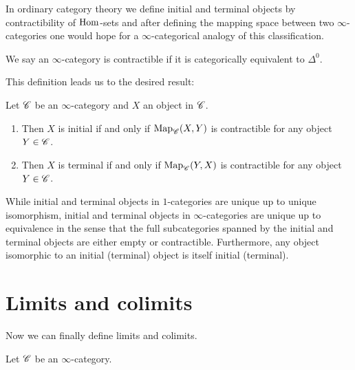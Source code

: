 \documentclass[../../thesis.tex]{subfiles}
\begin{document}
In ordinary category theory we define initial and terminal objects by contractibility of $\mathrm{Hom}$-sets and after defining the mapping space between two $\infty$-categories one would hope for a $\infty$-categorical analogy of this classification.
\begin{definition}
    We say an $\infty$-category is contractible if it is categorically equivalent to $\Delta^0$.
\end{definition}
This definition leads us to the desired result:
\begin{proposition}
    Let $\mathscr{C}$ be an $\infty$-category and $X$ an object in $\mathscr{C}$.
    \begin{enumerate}
        \item Then $X$ is initial if and only if $\mathrm{Map}_{\mathscr{C}}(X,Y)$ is contractible for any object $Y\in \mathscr{C}$.
        \item Then $X$ is terminal if and only if $\mathrm{Map}_{\mathscr{C}}(Y,X)$ is contractible for any object $Y\in \mathscr{C}$.
    \end{enumerate}
\end{proposition}
While initial and terminal objects in $1$-categories are unique up to unique isomorphism, initial and terminal objects in $\infty$-categories are unique up to equivalence in the sense that the full subcategories spanned by the initial and terminal objects are either empty or contractible.
Furthermore, any object isomorphic to an initial (terminal) object is itself initial (terminal).
\section{Limits and colimits}
Now we can finally define limits and colimits.
\begin{definition}
    Let $\mathscr{C}$ be an $\infty$-category.
\end{definition}
\end{document}

